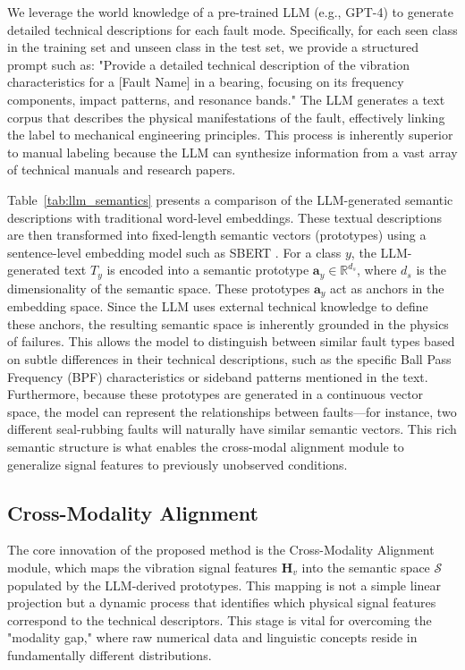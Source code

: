 \documentclass[journal]{IEEEtran}
\begin{document}
We leverage the world knowledge of a pre-trained LLM (e.g., GPT-4) to generate detailed technical descriptions for each fault mode. Specifically, for each seen class in the training set and unseen class in the test set, we provide a structured prompt such as: "Provide a detailed technical description of the vibration characteristics for a [Fault Name] in a bearing, focusing on its frequency components, impact patterns, and resonance bands." The LLM generates a text corpus that describes the physical manifestations of the fault, effectively linking the label to mechanical engineering principles. This process is inherently superior to manual labeling because the LLM can synthesize information from a vast array of technical manuals and research papers.

Table~\ref{tab:llm_semantics} presents a comparison of the LLM-generated semantic descriptions with traditional word-level embeddings. These textual descriptions are then transformed into fixed-length semantic vectors (prototypes) using a sentence-level embedding model such as SBERT \cite{reimers2019sentence}. For a class $y$, the LLM-generated text $T_y$ is encoded into a semantic prototype $\mathbf{a}_y \in \mathbb{R}^{d_s}$, where $d_s$ is the dimensionality of the semantic space. These prototypes $\mathbf{a}_y$ act as anchors in the embedding space. Since the LLM uses external technical knowledge to define these anchors, the resulting semantic space is inherently grounded in the physics of failures. This allows the model to distinguish between similar fault types based on subtle differences in their technical descriptions, such as the specific Ball Pass Frequency (BPF) characteristics or sideband patterns mentioned in the text. Furthermore, because these prototypes are generated in a continuous vector space, the model can represent the relationships between faults—for instance, two different seal-rubbing faults will naturally have similar semantic vectors. This rich semantic structure is what enables the cross-modal alignment module to generalize signal features to previously unobserved conditions.

\subsection{Cross-Modality Alignment}
The core innovation of the proposed method is the Cross-Modality Alignment module, which maps the vibration signal features $\mathbf{H}_v$ into the semantic space $\mathcal{S}$ populated by the LLM-derived prototypes. This mapping is not a simple linear projection but a dynamic process that identifies which physical signal features correspond to the technical descriptors. This stage is vital for overcoming the "modality gap," where raw numerical data and linguistic concepts reside in fundamentally different distributions.
\end{document}
